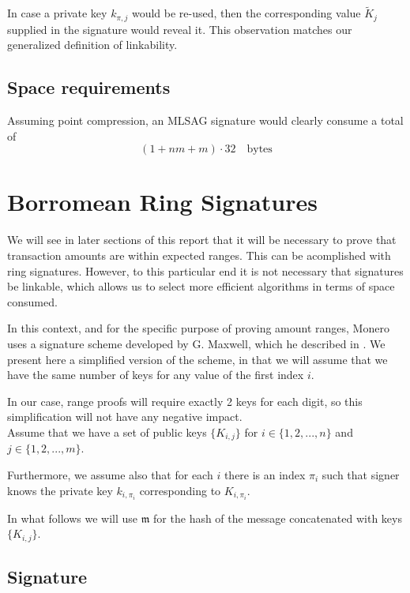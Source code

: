 In case a private key \(k_{\pi, j}\) would be re-used, then the corresponding value \(\tilde{K}_j\) supplied in the signature would reveal it.
This observation matches our generalized definition of linkability.


\subsection*{Space requirements}

Assuming point compression, an MLSAG signature would clearly consume a total of 
    \[(1 + n m + m) \cdot 32 \quad \textrm{bytes}\]


\section{Borromean Ring Signatures}
\label{sec:borromean}

We will see in later sections of this report that it will be necessary to prove that transaction amounts are within
expected ranges.
This can be acomplished with ring signatures. 
However, to this particular end it is not necessary that signatures be linkable, which allows us to select more efficient algorithms in terms of space consumed.

In this context, and for the specific purpose of proving amount ranges, Monero uses a signature scheme developed by G. Maxwell, which he described  in \cite{Signatures2015BorromeanRS}.
We present here a simplified version of the scheme, in that we will assume that
we have the same number of keys for any value of the first index \(i\).

In our case, range proofs will require exactly 2 keys for each digit, so this simplification
will not have any negative impact. 
\\


Assume that we have a set of public keys \(\{ K_{i,j} \} \) for \(i \in \{1, 2, ..., n\}\) and \(j \in \{1, 2, ..., m\}\).

Furthermore, we assume also that for each \(i\) there is an index \(\pi_i\) such that signer knows the private key \(k_{i,\pi_i}\) corresponding to \(K_{i,\pi_i}\).

In what follows we will use \(\mathfrak{m}\) for the hash of the message concatenated with keys
\(\{ K_{i,j} \} \).

\subsection*{Signature}


